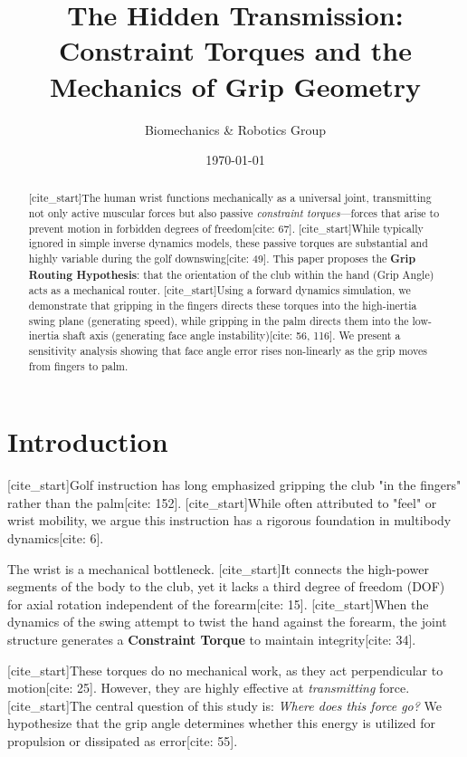 \documentclass[11pt, letterpaper]{article}
\title{\textbf{The Hidden Transmission: Constraint Torques and the Mechanics of Grip Geometry}}
\author{Biomechanics \& Robotics Group}
\date{\today}
\begin{document}
\maketitle

\begin{abstract}
[cite_start]The human wrist functions mechanically as a universal joint, transmitting not only active muscular forces but also passive \emph{constraint torques}—forces that arise to prevent motion in forbidden degrees of freedom[cite: 67]. [cite_start]While typically ignored in simple inverse dynamics models, these passive torques are substantial and highly variable during the golf downswing[cite: 49]. This paper proposes the \textbf{Grip Routing Hypothesis}: that the orientation of the club within the hand (Grip Angle) acts as a mechanical router. [cite_start]Using a forward dynamics simulation, we demonstrate that gripping in the fingers directs these torques into the high-inertia swing plane (generating speed), while gripping in the palm directs them into the low-inertia shaft axis (generating face angle instability)[cite: 56, 116]. We present a sensitivity analysis showing that face angle error rises non-linearly as the grip moves from fingers to palm.
\end{abstract}

\section{Introduction}

[cite_start]Golf instruction has long emphasized gripping the club "in the fingers" rather than the palm[cite: 152]. [cite_start]While often attributed to "feel" or wrist mobility, we argue this instruction has a rigorous foundation in multibody dynamics[cite: 6].

The wrist is a mechanical bottleneck. [cite_start]It connects the high-power segments of the body to the club, yet it lacks a third degree of freedom (DOF) for axial rotation independent of the forearm[cite: 15]. [cite_start]When the dynamics of the swing attempt to twist the hand against the forearm, the joint structure generates a \textbf{Constraint Torque} to maintain integrity[cite: 34].

[cite_start]These torques do no mechanical work, as they act perpendicular to motion[cite: 25]. However, they are highly effective at \emph{transmitting} force. [cite_start]The central question of this study is: \emph{Where does this force go?} We hypothesize that the grip angle determines whether this energy is utilized for propulsion or dissipated as error[cite: 55].
\end{document}
